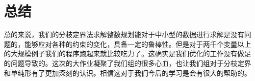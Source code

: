 \chapter{总结}

总的来说，我们的分枝定界法求解整数规划能对于中小型的数据进行求解是没有问题的，能够应对各种的约束的变化，具备一定的鲁棒性。但是对于两千个变量以上的大规模例子我们的程序跑起来就比较吃力了。这确实是我们优化的工作没有做足的问题导致的。这次的大作业凝聚了我们组的很多心血，也让我们组对于分枝定界和单纯形有了更加深刻的认识。相信这对于我们今后的学习是会有很大的帮助的。
